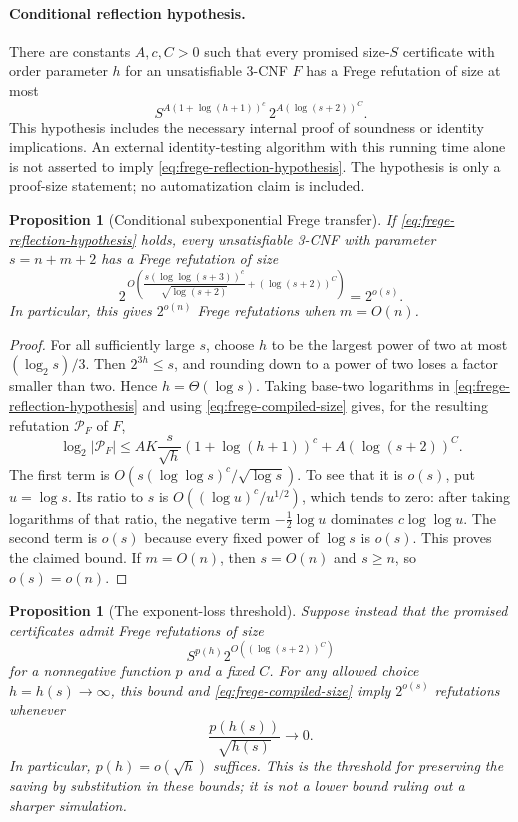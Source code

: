 \documentclass[11pt]{article}
\newtheorem{proposition}[theorem]{Proposition}
\theoremstyle{definition}
\theoremstyle{remark}
\begin{document}
\paragraph{Conditional reflection hypothesis.}
There are constants $A,c,C>0$ such that every promised size-$S$
certificate with order parameter $h$ for an unsatisfiable 3-CNF
$F$ has a Frege refutation of size at most
\[
 S^{A(1+\log(h+1))^c}\,
       2^{A(\log(s+2))^C}.
 \tag{F2}\label{eq:frege-reflection-hypothesis}
\]
This hypothesis includes the necessary internal proof of soundness
or identity implications. An external identity-testing algorithm
with this running time alone is not asserted to imply
\eqref{eq:frege-reflection-hypothesis}. The hypothesis is only a
proof-size statement; no automatization claim is included.

\begin{proposition}[Conditional subexponential Frege transfer]
\label{prop:conditional-frege-transfer}
If \eqref{eq:frege-reflection-hypothesis} holds, every unsatisfiable
3-CNF with parameter $s=n+m+2$ has a Frege refutation of size
\[
 2^{\,O\!\left(
      \dfrac{s(\log\log(s+3))^c}{\sqrt{\log(s+2)}}
        +(\log(s+2))^C\right)}
 =2^{o(s)}.
\]
In particular, this gives $2^{o(n)}$ Frege refutations when
$m=O(n)$.
\end{proposition}

\begin{proof}
For all sufficiently large $s$, choose $h$ to be the largest power
of two at most $(\log_2s)/3$. Then $2^{3h}\le s$, and rounding
down to a power of two loses a factor smaller than two. Hence
$h=\Theta(\log s)$. Taking base-two logarithms in
\eqref{eq:frege-reflection-hypothesis} and using
\eqref{eq:frege-compiled-size} gives, for the resulting refutation
$\mathcal P_F$ of $F$,
\[
 \log_2|\mathcal P_F|
 \le AK\frac{s}{\sqrt h}(1+\log(h+1))^c
                  +A(\log(s+2))^C.
\]
The first term is
$O(s(\log\log s)^c/\sqrt{\log s})$.
To see that it is $o(s)$, put $u=\log s$. Its ratio to $s$ is
$O((\log u)^c/u^{1/2})$, which tends to zero: after taking
logarithms of that ratio, the negative term
$-\tfrac12\log u$ dominates $c\log\log u$.
The second term is $o(s)$ because every fixed power of $\log s$
is $o(s)$. This proves the claimed bound. If $m=O(n)$, then
$s=O(n)$ and $s\ge n$, so $o(s)=o(n)$.
\end{proof}

\begin{proposition}[The exponent-loss threshold]
\label{prop:frege-loss-threshold}
Suppose instead that the promised certificates admit Frege
refutations of size
\[
 S^{p(h)}2^{O((\log(s+2))^C)}
\]
for a nonnegative function $p$ and a fixed $C$.
For any allowed choice $h=h(s)\to\infty$, this bound and
\eqref{eq:frege-compiled-size} imply $2^{o(s)}$ refutations whenever
\[
 \frac{p(h(s))}{\sqrt{h(s)}}\longrightarrow0.
\]
In particular, $p(h)=o(\sqrt h)$ suffices. This is the threshold
for preserving the saving by substitution in these bounds; it is
not a lower bound ruling out a sharper simulation.
\end{proposition}
\end{document}

